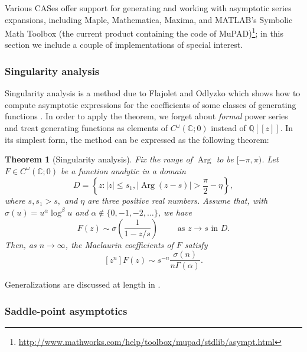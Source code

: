 \documentclass[12pt]{article}
\theoremstyle{plain}
\newtheorem{thm}{Theorem}
\DeclareMathOperator{\Arg}{Arg}
\begin{document}
Various CASes offer support for generating and working with asymptotic series expansions, including Maple, Mathematica, Maxima,
and MATLAB's Symbolic Math Toolbox (the current product containing the code of MuPAD)\footnote{
 \url{http://www.mathworks.com/help/toolbox/mupad/stdlib/asympt.html}
};
in this section we include a couple of implementations of special interest.

\subsubsection{Singularity analysis}
Singularity analysis is a method due to Flajolet and Odlyzko which shows how to compute asymptotic expressions for the coefficients of some classes of generating functions \cite{singularityanalysis}.
In order to apply the theorem, we forget about \emph{formal} power series and treat generating functions as elements of \( C^\omega(\mathbb{C}; 0) \) instead of \( \mathbb{Q}[[z]] \).
In its simplest form, the method can be expressed as the following theorem:
\begin{thm}[Singularity analysis]
Fix the range of  \( \Arg \) to be \( [-\pi, \pi) \).
Let \( F \in C^\omega(\mathbb{C}; 0) \) be a function analytic in a domain
\[ D = \left\{z : |z| \leq s_1, |\Arg(z-s)| > \frac{\pi}{2} - \eta \right\}, \]
where \( s, s_1 > s, \) and $\eta$ are three positive real numbers.  Assume that, with \( \sigma(u) = u^\alpha \log^\beta u \) and \( \alpha \notin \{0, -1, -2, \dots \} \), we have
\[ F(z) \sim \sigma \left( \frac{1}{1-z/s} \right) \qquad \text{ as } z \rightarrow s \text{ in } D. \]
Then, as \( n \rightarrow \infty \), the Maclaurin coefficients of \( F \) satisfy
\[ [z^n]F(z) \sim s^{-n} \frac{\sigma(n)}{n \Gamma(\alpha)}. \]
\end{thm}
Generalizations are discussed at length in \cite{ac}.

\subsubsection{Saddle-point asymptotics}
\end{document}
